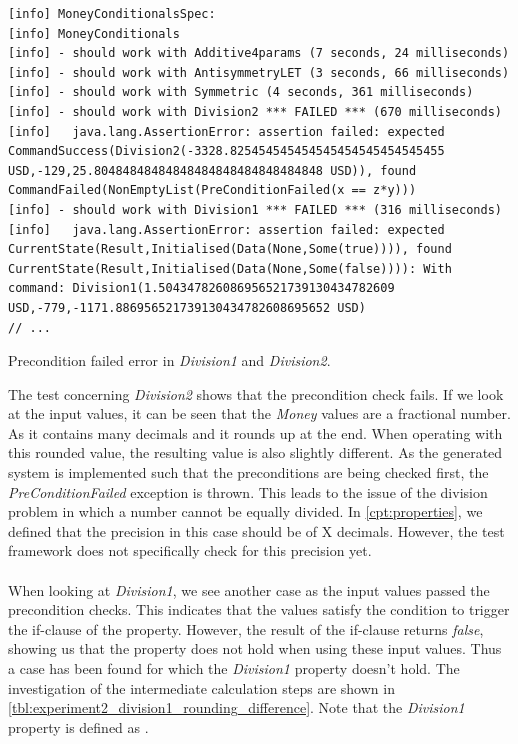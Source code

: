 \FloatBarrier
\begin{sourcecode}[!ht]
\begin{lstlisting}[language=Log]
[info] MoneyConditionalsSpec:
[info] MoneyConditionals
[info] - should work with Additive4params (7 seconds, 24 milliseconds)
[info] - should work with AntisymmetryLET (3 seconds, 66 milliseconds)
[info] - should work with Symmetric (4 seconds, 361 milliseconds)
[info] - should work with Division2 *** FAILED *** (670 milliseconds)
[info]   java.lang.AssertionError: assertion failed: expected CommandSuccess(Division2(-3328.825454545454545454545454545455 USD,-129,25.80484848484848484848484848484848 USD)), found CommandFailed(NonEmptyList(PreConditionFailed(x == z*y)))
[info] - should work with Division1 *** FAILED *** (316 milliseconds)
[info]   java.lang.AssertionError: assertion failed: expected CurrentState(Result,Initialised(Data(None,Some(true)))), found CurrentState(Result,Initialised(Data(None,Some(false)))): With command: Division1(1.504347826086956521739130434782609 USD,-779,-1171.886956521739130434782608695652 USD)
// ...
\end{lstlisting}
\caption{Precondition failed error in \textit{Division1} and \textit{Division2}.}
\label{lst:experiment2_log_second_run}
\end{sourcecode}
\FloatBarrier
The test concerning \textit{Division2} shows that the precondition check fails.
If we look at the input values, it can be seen that the \textit{Money} values
are a fractional number. As it contains many decimals and it rounds up at the
end. When operating with this rounded value, the resulting value is also
slightly different. As the generated system is implemented such that the
preconditions are being checked first, the \textit{PreConditionFailed} exception
is thrown. This leads to the issue of the division problem
 in which a number cannot be equally divided. In
\autoref{cpt:properties}, we defined that the precision in this case should be
of X  decimals. However, the test framework does not specifically
check for this precision yet.\\
\\
When looking at \textit{Division1}, we see another case as the input values
passed the precondition checks. This indicates that the values satisfy the
condition to trigger the if-clause of the property. However, the result of the
if-clause returns \textit{false}, showing us that the property does not hold
when using these input values. Thus a case has been found for which the
\textit{Division1} property doesn't hold. The investigation of the intermediate
calculation steps are shown in
\autoref{tbl:experiment2_division1_rounding_difference}. Note that the
\textit{Division1} property is defined as .

